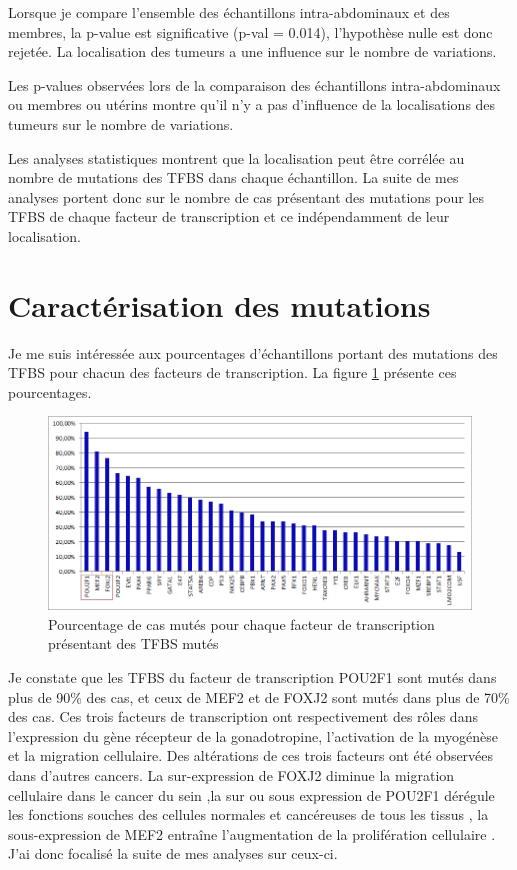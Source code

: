 Lorsque je compare l'ensemble des échantillons intra-abdominaux et des membres, la p-value est significative (p-val = 0.014), l'hypothèse nulle est donc rejetée. La localisation des tumeurs a une influence sur le nombre de variations.

Les p-values observées lors de la comparaison des échantillons intra-abdominaux ou membres ou utérins montre  qu'il n'y a pas d'influence de la localisations des tumeurs sur le nombre de variations.

Les analyses statistiques montrent que la localisation peut être corrélée au nombre de mutations des TFBS dans chaque échantillon. La suite de mes analyses portent donc sur le nombre de cas présentant des mutations pour les TFBS de chaque facteur de transcription et ce indépendamment de leur localisation.

\section{Caractérisation des mutations}

Je me suis intéressée aux pourcentages d'échantillons portant des mutations des TFBS pour chacun des facteurs de transcription. La figure \ref{fig:pourcent} présente ces pourcentages. 

\begin{figure}[h]
\centering
\includegraphics[scale=0.7]{Figures/pourcentage.png}
\captionsetup{justification=centering}
\caption{Pourcentage de cas mutés pour chaque facteur de transcription présentant des TFBS mutés}
\label{fig:pourcent}
\end{figure}

Je constate que les TFBS du facteur de transcription POU2F1 sont mutés dans plus de 90\% des cas, et ceux de MEF2 et de FOXJ2 sont mutés dans plus de 70\% des cas.  Ces trois facteurs de transcription ont respectivement des rôles dans  l'expression du  gène récepteur de la gonadotropine, l'activation de la myogénèse et la migration cellulaire. Des altérations de ces trois facteurs ont été observées dans d'autres cancers. La sur-expression de FOXJ2 diminue la migration cellulaire dans le cancer du sein \citep{foxj2_cancer},la sur ou sous expression de POU2F1 dérégule les fonctions souches des cellules normales et cancéreuses de tous les tissus \citep{oct1_cancer}, la sous-expression de MEF2 entraîne l'augmentation de la prolifération cellulaire \citep{mef2_cancer}. J'ai donc focalisé la suite de mes analyses sur ceux-ci.

